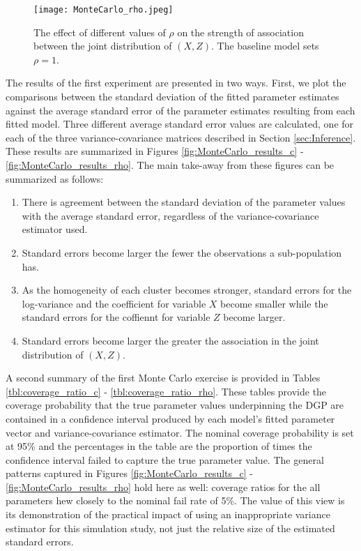 \documentclass[12pt]{article}
\theoremstyle{definition}
\begin{document}
\begin{figure}[!ht]
    \centering
    \texttt{[image: MonteCarlo\_rho.jpeg]}
    \caption{The effect of different values of $\rho$ on the strength of association between the joint distribution of $(X, Z)$. The baseline model sets $\rho = 1$.} 
    \label{fig:MC_rho}
\end{figure}

The results of the first experiment are presented in two ways. First, we plot the comparisons between the standard deviation of the fitted parameter estimates against the average standard error of the parameter estimates resulting from each fitted model. Three different average standard error values are calculated, one for each of the three variance-covariance matrices described in Section \ref{sec:Inference}. These results are summarized in Figures \ref{fig:MonteCarlo_results_c} - \ref{fig:MonteCarlo_results_rho}. The main take-away from these figures can be summarized as follows:

\begin{enumerate}
  \item There is agreement between the standard deviation of the parameter values with the average standard error, regardless of the variance-covariance estimator used.
  \item Standard errors become larger the fewer the observations a sub-population has.
  \item As the homogeneity of each cluster becomes stronger, standard errors for the log-variance and the coefficient for variable $X$ become smaller while the standard errors for the coffiennt for variable $Z$ become larger.
  \item Standard errors become larger the greater the association in the joint distribution of $(X, Z)$. 
\end{enumerate}

\bigskip

A second summary of the first Monte Carlo exercise is provided in Tables \ref{tbl:coverage_ratio_c} - \ref{tbl:coverage_ratio_rho}. These tables provide the coverage probability that the true parameter values underpinning the DGP are contained in a confidence interval produced by each model's fitted parameter vector and variance-covariance estimator. The nominal coverage probability is set at 95\% and the percentages in the table are the proportion of times the confidence interval failed to capture the true parameter value. The general patterns captured in Figures \ref{fig:MonteCarlo_results_c} - \ref{fig:MonteCarlo_results_rho} hold here as well: coverage ratios for the all parameters hew closely to the nominal fail rate of 5\%. The value of this view is its demonstration of the practical impact of using an inappropriate variance estimator for this simulation study, not just the relative size of the estimated standard errors.
\end{document}
